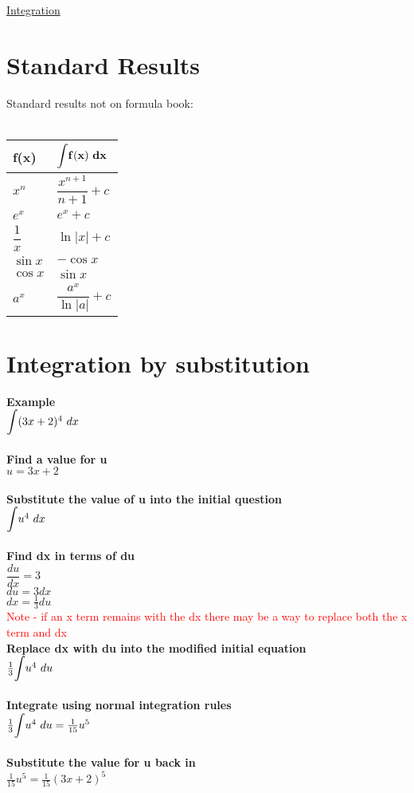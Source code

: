 \documentclass{article}[18pt]
\begin{document}
\begin{center}
\underline{\huge Integration}
\end{center}
\section{Standard Results}
Standard results not on formula book:\\
\\
{\renewcommand{\arraystretch}{2}
\begin{tabularx}{\textwidth}{|X|X|}
 \hline
 \textbf{f(x)} & $\mathbf{\mathlarger{\int} f(x)\ dx}$ \\
 \hline
 $x^n$  & $\dfrac{x^{n+1}}{n+1}+c$ \\
\hline
$e^x$&$e^x+c$\\
\hline
$\dfrac{1}{x}$&$\ln|x|+c$\\
\hline
$\sin x$&$-\cos x$\\
\hline
$\cos x$&$\sin x$\\
\hline
$a^x$&$\dfrac{a^x}{\ln|a|}+c$\\
\hline
\end{tabularx}
}
\section{Integration by substitution}
\textbf{Example}\\
$\mathlarger{\int}(3x+2)^4 \ dx$\\
\\
\textbf{Find a value for u}\\
$u=3x+2$\\
\\
\textbf{Substitute the value of u into the initial question}\\
$\mathlarger{\int}u^4 \ dx$\\
\\
\textbf{Find dx in terms of du}\\
$\dfrac{du}{dx}=3$\\
$du=3dx$\\
$dx=\frac{1}{3}du$\\
\textcolor{red}{Note - if an x term remains with the dx there may be a way to replace both the x term and dx}
\\
\textbf{Replace dx with du into the modified initial equation}\\
$\frac{1}{3}\mathlarger{\int}u^4 \ du$\\
\\
\textbf{Integrate using normal integration rules}\\
$\frac{1}{3}\mathlarger{\int}u^4 \ du=\frac{1}{15}u^5$\\
\\
\textbf{Substitute the value for u back in}\\
$\frac{1}{15}u^5=\frac{1}{15}(3x+2)^5$\\
\newpage
\end{document}
